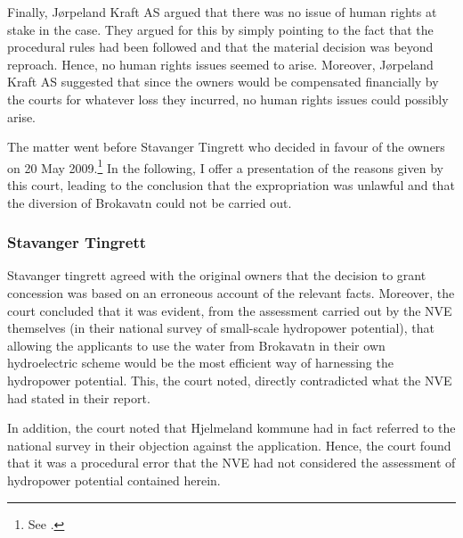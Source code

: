 Finally, Jørpeland Kraft AS argued that there was no issue of human rights at stake in the case. They argued for this by simply pointing to the fact that the procedural rules had been followed and that  the material decision was beyond reproach. Hence, no human rights issues seemed to arise. Moreover, Jørpeland Kraft AS suggested that since the owners would be compensated financially by the courts for whatever loss they incurred, no human rights issues could possibly arise.

The matter went before Stavanger Tingrett who decided in favour of the owners on 20 May 2009.\footnote{See \cite{jorpeland09}.} In the following, I offer a presentation of the reasons given by this court, leading to the conclusion that the expropriation was unlawful and that the diversion of Brokavatn could not be carried out.

\subsubsection{Stavanger Tingrett}

Stavanger tingrett agreed with the original owners that the decision to grant concession was based on an erroneous account of the relevant facts. Moreover, the court concluded that it was evident, from the assessment carried out by the NVE themselves (in their national survey of small-scale hydropower potential), that allowing the applicants to use the water from Brokavatn in their own hydroelectric scheme would be the most efficient way of harnessing the hydropower potential. This, the court noted, directly contradicted what the NVE had stated in their report.

In addition, the court noted that Hjelmeland kommune had in fact referred to the national survey in their objection against the application. Hence, the court found that it was a procedural error that the NVE had not considered the assessment of hydropower potential contained herein.

